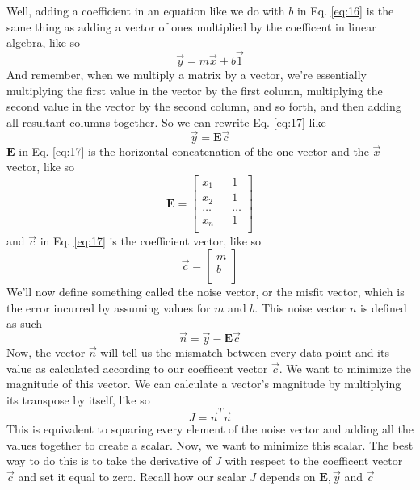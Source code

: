 \documentclass{article}
\begin{document}
Well, adding a coefficient in an equation like we do with $b$ in Eq. \ref{eq:16} is the same thing as adding a vector of ones multiplied by the coefficent in linear algebra, like so
\begin{equation}
\label{eq:17}
\vec{y} = m \vec{x} + b \vec{1}
\end{equation}
And remember, when we multiply a matrix by a vector, we're essentially multiplying the first value in the vector by the first column, multiplying the second value in the vector by the second column, and so forth, and then adding all resultant columns together. So we can rewrite Eq. \ref{eq:17} like
\begin{equation}
\label{eq:18}
\vec{y} = \mathbf{E} \vec{c}
\end{equation}
$\mathbf{E}$ in Eq. \ref{eq:17} is the horizontal concatenation of the one-vector and the $\vec{x}$ vector, like so
\begin{equation}
\label{eq:19}
\mathbf{E} =
\begin{bmatrix}
  x_1 && 1 \\
  x_2 && 1 \\
  \dots && \dots \\
  x_n && 1 \\
\end{bmatrix}
\end{equation}
and $\vec{c}$ in Eq. \ref{eq:17} is the coefficient vector, like so
\begin{equation}
\label{eq:20}
\vec{c} =
\begin{bmatrix}
  m \\
  b \\
\end{bmatrix}
\end{equation}
We'll now define something called the noise vector, or the misfit vector, which is the error incurred by assuming values for $m$ and $b$. This noise vector $n$ is defined as such
\begin{equation}
\label{eq:21}
\vec{n} =  \vec{y}-\mathbf{E} \vec{c}
\end{equation}
Now, the vector $\vec{n}$ will tell us the mismatch between every data point and its value as calculated according to our coefficent vector $\vec{c}$. We want to minimize the magnitude of this vector. We can calculate a vector's magnitude by multiplying its transpose by itself, like so
\begin{equation}
\label{eq:22}
J = \vec{n}^T\vec{n}
\end{equation}
This is equivalent to squaring every element of the noise vector and adding all the values together to create a scalar. Now, we want to minimize this scalar. The best way to do this is to take the derivative of $J$ with respect to the coefficent vector $\vec{c}$ and set it equal to zero. Recall how our scalar $J$ depends on $\mathbf{E}, \vec{y}$ and $\vec{c}$
\end{document}
